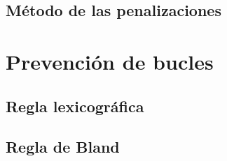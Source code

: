 \subsection{Método de las penalizaciones}
\section{Prevención de bucles}
\subsection{Regla lexicográfica}
\subsection{Regla de Bland}